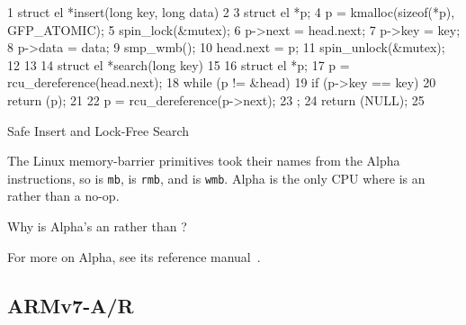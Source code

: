 \begin{listing}[tbp]
{ \scriptsize
\begin{verbbox}
 1  struct el *insert(long key, long data)
 2  {
 3      struct el *p;
 4      p = kmalloc(sizeof(*p), GFP_ATOMIC);
 5      spin_lock(&mutex);
 6      p->next = head.next;
 7      p->key = key;
 8      p->data = data;
 9      smp_wmb();
10      head.next = p;
11      spin_unlock(&mutex);
12  }
13
14  struct el *search(long key)
15  {
16      struct el *p;
17      p = rcu_dereference(head.next);
18      while (p != &head) {
19          if (p->key == key) {
20              return (p);
21          }
22          p = rcu_dereference(p->next);
23      };
24      return (NULL);
25  }
\end{verbbox}
}
\centering
\theverbbox
\caption{Safe Insert and Lock-Free Search}
\label{lst:memorder:Safe Insert and Lock-Free Search}
\end{listing}

The Linux memory-barrier primitives took their names from the Alpha
instructions, so  is {\tt mb},  is {\tt rmb},
and  is {\tt wmb}.
Alpha is the only CPU where  is
an  rather than a no-op.

\QuickQuiz{}
	Why is Alpha's  an
	 rather than ?
 \QuickQuizEnd

For more on Alpha, see its reference manual~\cite{ALPHA2002}.

\subsection{ARMv7-A/R}
\label{sec:memorder:ARMv7-A/R}

